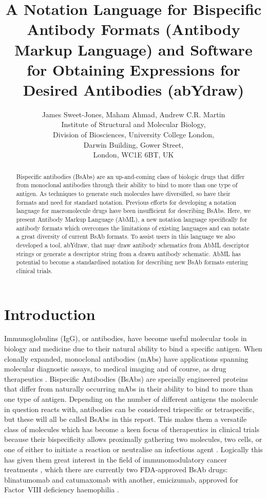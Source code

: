 \documentclass{article}
\title{A Notation Language for Bispecific Antibody Formats (Antibody
Markup Language) and Software for Obtaining Expressions for Desired
Antibodies (abYdraw)}
\author{James Sweet-Jones, Maham Ahmad, Andrew C.R. Martin\\
Institute of Structural and Molecular Biology,\\
Division of Biosciences, University College London,\\
Darwin Building, Gower Street,\\
London, WC1E 6BT, UK}
\begin{document}
\maketitle

\begin{abstract}
Bispecific antibodies (BsAbs) are an up-and-coming class of biologic
drugs that differ from monoclonal antibodies through their ability to
bind to more than one type of antigen. As techniques to generate such
molecules have diversified, so have their formats and need for
standard notation. Previous efforts for developing a notation language
for macromolecule drugs have been insufficient for describing
BsAbs. Here, we present Antibody Markup Language (AbML), a new
notation language specifically for antibody formats which overcomes
the limitations of existing languages and can notate a great diversity
of current BsAb formats. To assist users in this language we also
developed a tool, abYdraw, that may draw antibody schematics from AbML
descriptor strings or generate a descriptor string from a drawn
antibody schematic. AbML has potential to become a standardised
notation for describing new BsAb formats entering clinical trials.
\end{abstract}

\section{Introduction}

Immunoglobulins (IgG), or antibodies, have become useful molecular
tools in biology and medicine due to their natural ability to bind a
specific antigen. When clonally expanded, monoclonal antibodies (mAbs)
have applications spanning molecular diagnostic assays, to medical
imaging and of course, as drug therapeutics \cite{ma:2021}.
Bispecific Antibodies (BsAbs) are specially engineered proteins
that differ from naturally occurring mAbs in their ability to bind to
more than one type of antigen. Depending on the number of different
antigens the molecule in question reacts with, antibodies can be
considered trispecific or tetraspecific, but these will all be called
BsAbs in this report. This makes them a versatile class of molecules
which has become a keen focus of therapeutics in clinical trials
because their bispecificity allows proximally gathering two molecules,
two cells, or one of either to initiate a reaction or neutralise an
infectious agent \cite{fan:2015}. Logically this has given them
great interest in the field of immunomodulatory cancer treatments
\cite{labrijn:2019}, which there are currently two FDA-approved
BsAb drugs: blinatumomab and catumaxomab
\cite{wilke:2017,seimetz:2011} with another, emicizumab, approved for
Factor~VIII deficiency haemophilia \cite{schmitt:2021}. 
\end{document}
